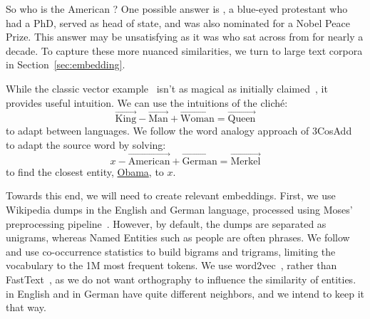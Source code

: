 So who is the American ?
%
One possible answer is , a blue-eyed protestant who had a PhD, served as head of state, and
was also nominated for a Nobel Peace Prize.  
%
This answer may be unsatisfying as it was  who sat across from  for nearly a decade.
%
To capture these more nuanced similarities, we turn to large text corpora in Section~\ref{sec:embedding}.


While the classic  vector
example~\citep{mikolov2013linguistic} isn't as magical as initially
claimed~\citep{rogers2017too}, it provides useful intuition.  We can use
the intuitions of the clich\'e:
%
\begin{equation}
\overrightarrow{\mbox{King}} - \overrightarrow{\mbox{Man}} + \overrightarrow{\mbox{Woman}} = \overrightarrow{\mbox{Queen}}
\end{equation}
to adapt between languages.  
%
We follow the word analogy approach of 3CosAdd~\citep{levy2014linguistic, koper2016improving} to adapt the source word by solving:
%
\begin{equation}
x - \overrightarrow{\mbox{American}} + \overrightarrow{\mbox{German}}
= \overrightarrow{\mbox{Merkel}}
\end{equation}
to find the closest entity, \underline{Obama}, to $x$.


Towards this end, we will need to create relevant embeddings.
%
First, we use Wikipedia dumps in the English and German language,
processed using Moses' preprocessing pipeline~\citep{koehn2007moses}.
%
However, by default, the dumps are separated as unigrams, whereas
Named Entities such as people are often phrases.
%
We follow \citet{mikolov2013distributed} and use co-occurrence
statistics to build bigrams and trigrams, limiting the vocabulary to
the 1M most frequent tokens.
%
%
We use word2vec~\citep{mikolov2013distributed}, rather than FastText~\citep{bojanowski2016enriching}, as we do not want orthography to influence the similarity of entities.
%
 in English and in German have quite different
neighbors, and we intend to keep it that way.
%

